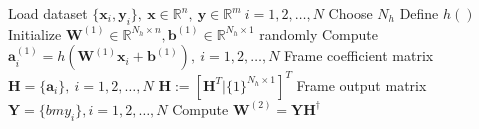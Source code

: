 \documentclass{article}
\begin{document}
\begin{algorithm}
    \renewcommand{\thealgorithm}{}
    \caption{Extreme Learning Machines}\label{alg:cap}
    \begin{algorithmic}
        \State Load dataset $\{\bm{x}_i,\bm{y}_i\}, \ \bm{x} \in \mathbb{R}^n, \ \bm{y}\in\mathbb{R}^m \ i=1,2,\dots,N$
        \State Choose $N_h$ 
        \State Define $h()$ 
        \State Initialize $\bm{W}^{(1)}\in\mathbb{R}^{N_h\times n},\bm{b}^{(1)}\in\mathbb{R}^{N_h\times 1}$ randomly 
        \State Compute $\bm{a}_i^{(1)} = h\left(\bm{W}^{(1)}\bm{x}_i + \bm{b}^{(1)}\right), \ i=1,2,\dots,N$
        \State Frame coefficient matrix $\bm{H} = \{\bm{a}_i\}, \ i=1,2,\dots,N$ 
            \State $\bm{H} := \left[ \bm{H}^T | \{1\}^{N_h\times 1}\right]^T$
        \EndIf
        \State Frame output matrix $\bm{Y} = \{bm{y}_i\}, i=1,2,\dots,N$ 
        \State Compute $\bm{W}^{(2)} =  \bm{Y}\bm{H}^{\dagger}$ 
    \end{algorithmic}
\end{algorithm}
\end{document}
